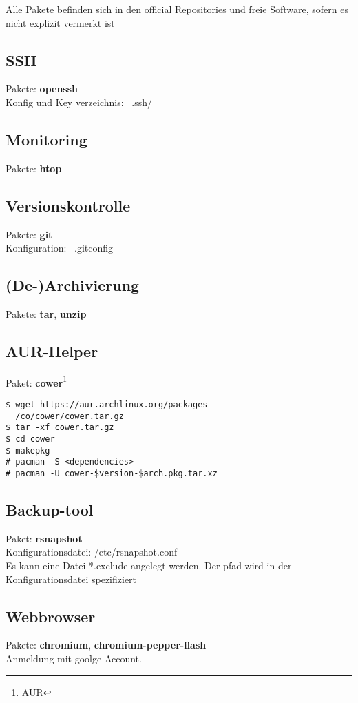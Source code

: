 Alle Pakete befinden sich in den official Repositories und freie Software,
sofern es nicht explizit vermerkt ist

\subsection{SSH}
Pakete: \textbf{openssh} \\
Konfig und Key verzeichnis: ~.ssh/

\subsection{Monitoring}
Pakete: \textbf{htop} 

\subsection{Versionskontrolle}
Pakete: \textbf{git} \\
Konfiguration: ~.gitconfig


\subsection{(De-)Archivierung}
Pakete: \textbf{tar}, \textbf{unzip} 

\subsection{AUR-Helper}
Paket: \textbf{cower}\footnote{AUR} 
\begin{lstlisting}[style=Bash]
$ wget https://aur.archlinux.org/packages 
  /co/cower/cower.tar.gz
$ tar -xf cower.tar.gz
$ cd cower
$ makepkg
# pacman -S <dependencies>
# pacman -U cower-$version-$arch.pkg.tar.xz
\end{lstlisting}

\subsection{Backup-tool}
Paket: \textbf{rsnapshot} \\ 
Konfigurationsdatei: /etc/rsnapshot.conf \\
Es kann eine Datei *.exclude angelegt werden.
Der pfad wird in der Konfigurationsdatei spezifiziert

\subsection{Webbrowser}
Pakete: \textbf{chromium}, \textbf{chromium-pepper-flash} \\ 
Anmeldung mit goolge-Account.

